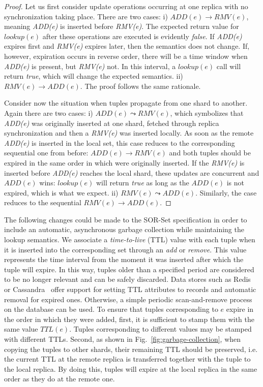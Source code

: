 \begin{proof}
Let us first consider update operations occurring at one replica with no
synchronization taking place. There are two cases: i) $ADD(e) \rightarrow
RMV(e)$, meaning \textit{ADD(e)} is inserted before \textit{RMV(e)}. The
expected return value for $\textit{lookup}(e)$ after these operations are
executed is evidently \textit{false}. If \textit{ADD(e)} expires first and
\textit{RMV(e)} expires later, then the semantics does not change. If, however,
expiration occurs in reverse order, there will be a time window when
\textit{ADD(e)} is present, but \textit{RMV(e)} not. In this interval, a
$\textit{lookup}(e)$ call will return \textit{true}, which will change the
expected semantics. ii) $RMV(e) \rightarrow ADD(e)$. The proof follows the same
rationale.

Consider now the situation when tuples propagate from one shard to another.
Again there are two cases: i) $ADD(e) \leadsto RMV(e)$, which symbolizes that
\textit{ADD(e)} was originally inserted at one shard, fetched through replica
synchronization and then a \textit{RMV(e)} was inserted locally. As soon as the
remote \textit{ADD(e)} is inserted in the local set, this case reduces to the
corresponding sequential one from before: $ADD(e) \rightarrow RMV(e)$ and both
tuples should be expired in the same order in which were originally inserted.
If the \textit{RMV(e)} is inserted before \textit{ADD(e)} reaches the local
shard, these updates are concurrent and $ADD(e)$ wins: $\textit{lookup}(e)$ will
return \textit{true} as long as the $ADD(e)$ is not expired, which is what we
expect. ii) $RMV(e) \leadsto ADD(e)$. Similarly, the case reduces to the
sequential $RMV(e) \rightarrow ADD(e)$.
\end{proof}

The following changes could be made to the SOR-Set specification in order to
include an automatic, asynchronous garbage collection while maintaining the
lookup semantics. We associate a \textit{time-to-live} (TTL) value with each
tuple when it is inserted into the corresponding set through an \textit{add} or
\textit{remove}. This value represents the time interval from the moment it was
inserted after which the tuple will expire. In this way, tuples older than a
specified period are considered to be no longer relevant and can be safely
discarded. Data stores such as Redis~\cite{redis} or Cassandra~\cite{cassandra}
offer support for setting TTL attributes to records and automatic removal for
expired ones. Otherwise, a simple periodic scan-and-remove process on the
database can be used. To ensure that tuples corresponding to $e$ expire in the
order in which they were added, first, it is sufficient to stamp them with the
same value $TTL(e)$. Tuples corresponding to different values may be stamped
with different TTLs. Second, as shown in Fig.~\ref{fig:garbage-collection}, when
copying the tuples to other shards, their remaining TTL should be preserved,
i.e. the current TTL at the remote replica is transferred together with the
tuple to the local replica. By doing this, tuples will expire at the local
replica in the same order as they do at the remote one.

